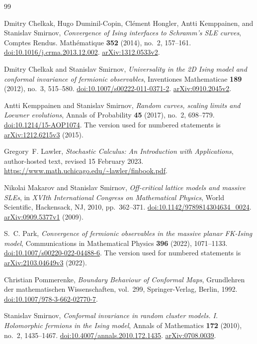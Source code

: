 {}
\begin{thebibliography}{99}

Dmitry Chelkak, Hugo Duminil-Copin, Cl\'ement Hongler,
Antti Kemppainen, and Stanislav Smirnov,
\emph{Convergence of Ising interfaces to Schramm's SLE curves},
Comptes Rendus. Math\'ematique \textbf{352} (2014), no.~2, 157--161.
\href{https://doi.org/10.1016/j.crma.2013.12.002}{doi:10.1016/j.crma.2013.12.002}.
\href{https://arxiv.org/abs/1312.0533v2}{arXiv:1312.0533v2}.

Dmitry Chelkak and Stanislav Smirnov,
\emph{Universality in the 2D Ising model and conformal invariance of fermionic observables},
Inventiones Mathematicae \textbf{189} (2012), no.~3, 515--580.
\href{https://doi.org/10.1007/s00222-011-0371-2}{doi:10.1007/s00222-011-0371-2}.
\href{https://arxiv.org/abs/0910.2045v2}{arXiv:0910.2045v2}.

Antti Kemppainen and Stanislav Smirnov,
\emph{Random curves, scaling limits and Loewner evolutions},
Annals of Probability \textbf{45} (2017), no.~2, 698--779.
\href{https://doi.org/10.1214/15-AOP1074}{doi:10.1214/15-AOP1074}.
The version used for numbered statements is
\href{https://arxiv.org/abs/1212.6215v3}{arXiv:1212.6215v3} (2015).

Gregory~F. Lawler,
\emph{Stochastic Calculus: An Introduction with Applications},
author-hosted text, revised 15 February 2023.
\url{https://www.math.uchicago.edu/~lawler/finbook.pdf}.

Nikolai Makarov and Stanislav Smirnov,
\emph{Off-critical lattice models and massive SLEs},
in \emph{XVIth International Congress on Mathematical Physics},
World Scientific, Hackensack, NJ, 2010, pp.~362--371.
\href{https://doi.org/10.1142/9789814304634_0024}{doi:10.1142/9789814304634\_0024}.
\href{https://arxiv.org/abs/0909.5377v1}{arXiv:0909.5377v1} (2009).

S.~C. Park,
\emph{Convergence of fermionic observables in the massive planar FK-Ising model},
Communications in Mathematical Physics \textbf{396} (2022), 1071--1133.
\href{https://doi.org/10.1007/s00220-022-04488-6}{doi:10.1007/s00220-022-04488-6}.
The version used for numbered statements is
\href{https://arxiv.org/abs/2103.04649v3}{arXiv:2103.04649v3} (2022).

Christian Pommerenke,
\emph{Boundary Behaviour of Conformal Maps},
Grundlehren der mathematischen Wissenschaften, vol.~299,
Springer-Verlag, Berlin, 1992.
\href{https://doi.org/10.1007/978-3-662-02770-7}{doi:10.1007/978-3-662-02770-7}.

Stanislav Smirnov,
\emph{Conformal invariance in random cluster models.
I. Holomorphic fermions in the Ising model},
Annals of Mathematics \textbf{172} (2010), no.~2, 1435--1467.
\href{https://doi.org/10.4007/annals.2010.172.1435}{doi:10.4007/annals.2010.172.1435}.
\href{https://arxiv.org/abs/0708.0039}{arXiv:0708.0039}.

\end{thebibliography}
